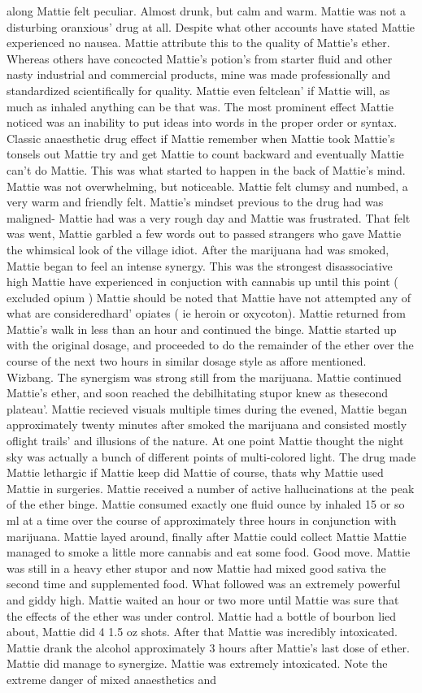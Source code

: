 \documentclass[12pt]{book}
\begin{document}
along Mattie felt peculiar. Almost drunk, but calm and warm. Mattie was not a disturbing oranxious' drug at all. Despite what other accounts have stated Mattie experienced no nausea. Mattie attribute this to the quality of Mattie's ether. Whereas others have concocted Mattie's potion's from starter fluid and other nasty industrial and commercial products, mine was made professionally and standardized scientifically for quality. Mattie even feltclean' if Mattie will, as much as inhaled anything can be that was. The most prominent effect Mattie noticed was an inability to put ideas into words in the proper order or syntax. Classic anaesthetic drug effect if Mattie remember when Mattie took Mattie's tonsels out Mattie try and get Mattie to count backward and eventually Mattie can't do Mattie. This was what started to happen in the back of Mattie's mind. Mattie was not overwhelming, but noticeable. Mattie felt clumsy and numbed, a very warm and friendly felt. Mattie's mindset previous to the drug had was maligned- Mattie had was a very rough day and Mattie was frustrated. That felt was went, Mattie garbled a few words out to passed strangers who gave Mattie the whimsical look of the village idiot. After the marijuana had was smoked, Mattie began to feel an intense synergy. This was the strongest disassociative high Mattie have experienced in conjuction with cannabis up until this point ( excluded opium ) Mattie should be noted that Mattie have not attempted any of what are consideredhard' opiates ( ie heroin or oxycoton). Mattie returned from Mattie's walk in less than an hour and continued the binge. Mattie started up with the original dosage, and proceeded to do the remainder of the ether over the course of the next two hours in similar dosage style as affore mentioned. Wizbang. The synergism was strong still from the marijuana. Mattie continued Mattie's ether, and soon reached the debilhitating stupor knew as thesecond plateau'. Mattie recieved visuals multiple times during the evened, Mattie began approximately twenty minutes after smoked the marijuana and consisted mostly oflight trails' and illusions of the nature. At one point Mattie thought the night sky was actually a bunch of different points of multi-colored light. The drug made Mattie lethargic if Mattie keep did Mattie of course, thats why Mattie used Mattie in surgeries. Mattie received a number of active hallucinations at the peak of the ether binge. Mattie consumed exactly one fluid ounce by inhaled 15 or so ml at a time over the course of approximately three hours in conjunction with marijuana. Mattie layed around, finally after Mattie could collect Mattie Mattie managed to smoke a little more cannabis and eat some food. Good move. Mattie was still in a heavy ether stupor and now Mattie had mixed good sativa the second time and supplemented food. What followed was an extremely powerful and giddy high. Mattie waited an hour or two more until Mattie was sure that the effects of the ether was under control. Mattie had a bottle of bourbon lied about, Mattie did 4 1.5 oz shots. After that Mattie was incredibly intoxicated. Mattie drank the alcohol approximately 3 hours after Mattie's last dose of ether. Mattie did manage to synergize. Mattie was extremely intoxicated. Note the extreme danger of mixed anaesthetics and 
\end{document}
